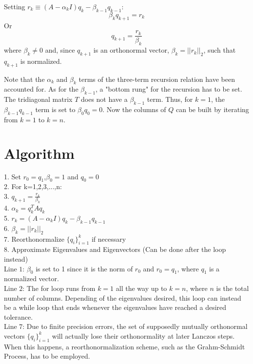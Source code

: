 Setting $r_k \equiv (A-\alpha_k I) q_k - \beta_{k-1} q_{k-1}$:
%
\begin{equation}
\beta_{k} q_{k+1} = r_{k}
\end{equation}
%
Or
%
 \begin{equation}
q_{k+1} = \frac{r_k}{\beta_{k}}
\end{equation}
%
where $\beta_{k} \neq 0$ and, since $q_{k+1}$ is an orthonormal vector, $\beta_{k} = || r_k ||_2$, such that $q_{k+1}$ is normalized.

Note that the $\alpha_k$ and $\beta_k$ terms of the three-term recursion relation have been accounted for. As for the $\beta_{k-1}$, a "bottom rung" for the recursion has to be set. The tridiagonal matrix $T$ does not have a $\beta_{k-1}$ term. Thus, for $k=1$, the $\beta_{k-1} q_{k-1}$ term is set to $\beta_{0} q_{0} = 0$. Now the columns of $Q$ can be built by iterating from $k=1$ to $k=n$.

\section{Algorithm}

 1. Set $r_0=q_1$,$\beta_0=1$ and $q_0 = 0$ \\
  2. For k=1,2,3,...,n: \\
  3.     $q_{k+1} = \frac{r_k}{\beta_{k}}$ \\
  4.     $\alpha_k = q_k^T A q_k$ \\
  5.     $r_k = (A - \alpha_k I)q_k - \beta_{k-1}q_{k-1}$ \\
  6.     $\beta_k = ||r_k||_2$ \\
  7.     Reorthonormalize $\lbrace q_i \rbrace_{i=1}^{k}$ if necessary \\
  8.     Approximate Eigenvalues and Eigenvectors (Can be done after the loop instead) \\

Line $1$: $\beta_0$ is set to 1 since it is the norm of $r_0$ and $r_0 = q_1$, where $q_1$ is a normalized vector. \\

Line $2$: The for loop runs from $k=1$ all the way up to $k=n$, where $n$ is the total number of columns. Depending of the eigenvalues desired, this loop can instead be a while loop that ends whenever the eigenvalues have reached a desired tolerance. \\

Line $7$: Due to finite precision errors, the set of supposedly mutually orthonormal vectors $\lbrace q_i \rbrace_{i=1}^{k}$ will actually lose their orthonormality at later Lanczos steps. When this happens, a reorthonormalization scheme, such as the Grahm-Schmidt Process, has to be employed. \\

